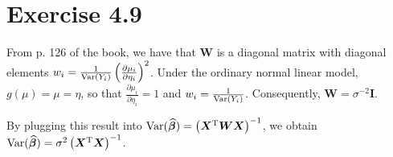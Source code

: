 \section*{Exercise 4.9}
From p. 126 of the book, we have that $\bm{W}$ is a diagonal matrix with diagonal elements $w_{i} = \frac{1}{\mathrm{Var}(Y_{i})}\left(\frac{\partial \mu_{i}}{\partial \eta_{i}}\right)^{2}$. Under the ordinary normal linear model, $g(\mu) = \mu = \eta$, so that $\frac{\partial \mu_{i}}{\partial \eta_{i}} = 1$ and $w_{i} = \frac{1}{\mathrm{Var}(Y_{i})}$. Consequently, $\bm{W} = \sigma^{-2}\bm{I}$.

By plugging this result into $\mathrm{Var}(\widehat{\bm{\beta}}) = \left(\bm{X}^{\rm T}\bm{W}\bm{X}\right)^{-1}$, we obtain $\mathrm{Var}(\widehat{\bm{\beta}}) = \sigma^{2}\left(\bm{X}^{\rm T}\bm{X}\right)^{-1}$.